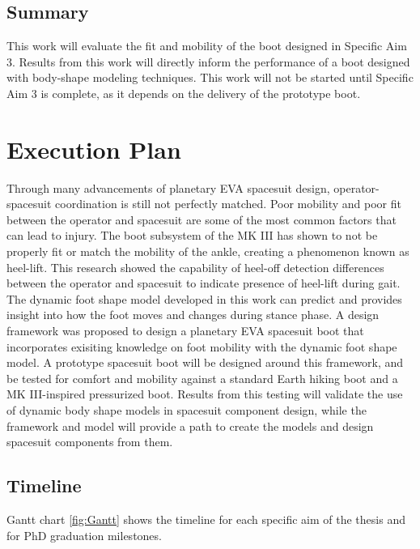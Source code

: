 \documentclass[defaultstyle,11pt]{comps}
\begin{document}
\hypertarget{summary-5}{%
\section{Summary}\label{summary-5}}

This work will evaluate the fit and mobility of the boot designed in Specific Aim 3.
Results from this work will directly inform the performance of a boot designed with body-shape modeling techniques.
This work will not be started until Specific Aim 3 is complete, as it depends on the delivery of the prototype boot.

\hypertarget{execution-plan}{%
\chapter{Execution Plan}\label{execution-plan}}

Through many advancements of planetary EVA spacesuit design, operator-spacesuit coordination is still not perfectly matched.
Poor mobility and poor fit between the operator and spacesuit are some of the most common factors that can lead to injury.
The boot subsystem of the MK III has shown to not be properly fit or match the mobility of the ankle, creating a phenomenon known as heel-lift.
This research showed the capability of heel-off detection differences between the operator and spacesuit to indicate presence of heel-lift during gait.
The dynamic foot shape model developed in this work can predict and provides insight into how the foot moves and changes during stance phase.
A design framework was proposed to design a planetary EVA spacesuit boot that incorporates exisiting knowledge on foot mobility with the dynamic foot shape model.
A prototype spacesuit boot will be designed around this framework, and be tested for comfort and mobility against a standard Earth hiking boot and a MK III-inspired pressurized boot.
Results from this testing will validate the use of dynamic body shape models in spacesuit component design, while the framework and model will provide a path to create the models and design spacesuit components from them.

\hypertarget{timeline}{%
\section{Timeline}\label{timeline}}

Gantt chart \ref{fig:Gantt} shows the timeline for each specific aim of the thesis and for PhD graduation milestones.
\end{document}
